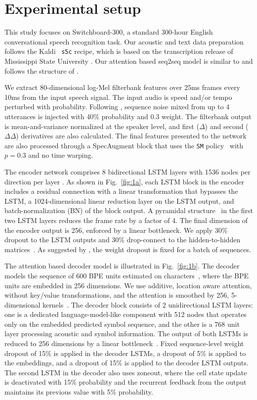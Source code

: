 \documentclass[a4paper]{article}
\begin{document}
\section{Experimental setup}
This study focuses on Switchboard-300, a standard 300-hour English conversational speech recognition task.
Our acoustic and text data preparation follows the Kaldi~\cite{Povey_ASRU2011} \texttt{s5c} recipe, which is based on the transcription release of Mississippi State University \cite{msu}.
Our attention based seq2seq model is similar to \cite{Bahdanau2016,Chan2016} and follows the structure of \cite{Tuske2019}.

We extract 80-dimensional log-Mel filterbank features over 25ms frames every 10ms from the input speech signal.
The input audio is speed and/or tempo perturbed with {\large {}} probability.
Following \cite{Saon2019}, sequence noise mixed from up to 4 utterances is injected with 40\% probability and 0.3 weight.
The filterbank output is mean-and-variance normalized at the speaker level, and first ($\Delta$) and second ($\Delta\Delta$) derivatives are also calculated.
The final features presented to the network are also processed through a SpecAugment block that uses the \texttt{SM} policy~\cite{Park2019} with $p=0.3$ and no time warping.

The encoder network comprises 8 bidirectional LSTM layers with 1536 nodes per direction per layer \cite{Hochreiter97,Schuster}. As shown in Fig.~\ref{fig:1a}, each LSTM block in the encoder includes a residual connection with a linear transformation that bypasses the LSTM, a 1024-dimensional linear reduction layer on the LSTM output, and batch-normalization (BN) of the block output. A pyramidal structure~\cite{Chan2016} in the first two LSTM layers reduces the frame rate by a factor of 4.
The final dimension of the encoder output is 256, enforced by a linear bottleneck.
We apply 30\% dropout to the LSTM outputs and 30\% drop-connect to the hidden-to-hidden matrices~\cite{pmlr-v28-wan13,JMLR:v15:srivastava14a}. As suggested by \cite{Gal2016}, the weight dropout is fixed for a batch of sequences.

The attention based decoder model is illustrated in Fig.~\ref{fig:1b}.
The decoder models the sequence of 600 BPE units estimated on characters~\cite{subword-nmt}, where the BPE units are embedded in 256 dimensions.
We use additive, location aware attention, without key/value transformations, and the attention is smoothed by 256, 5-dimensional kernels~\cite{chorowski15}.
The decoder block consists of 2 unidirectional LSTM layers: one is a dedicated language-model-like component with 512 nodes that operates only on the embedded predicted symbol sequence, and the other is a 768 unit layer processing acoustic and symbol information.
The output of both LSTMs is reduced to 256 dimensions by a linear bottleneck~\cite{Vesely2011}.
Fixed sequence-level weight dropout of 15\% is applied in the decoder LSTMs, a dropout of 5\% is applied to the embeddings, and a dropout of 15\% is applied to the decoder LSTM outputs.
The second LSTM in the decoder also uses zoneout, where the cell state update is deactivated with 15\% probability and the recurrent feedback from the output maintains its previous value with 5\% probability.
\end{document}
